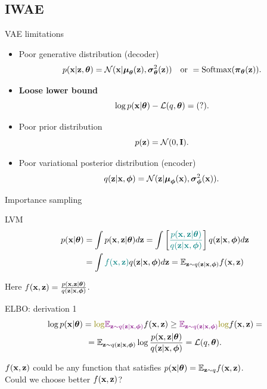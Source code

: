 \subsection{IWAE}
\begin{frame}{VAE limitations}
	\begin{itemize}
		\item Poor generative distribution (decoder)
		\[
			p(\mathbf{x} | \mathbf{z}, \boldsymbol{\theta}) = \mathcal{N}(\mathbf{x}| \boldsymbol{\mu}_{\boldsymbol{\theta}}(\mathbf{z}), \boldsymbol{\sigma}^2_{\boldsymbol{\theta}}(\mathbf{z})) \quad \text{or } = \text{Softmax}(\boldsymbol{\pi}_{\boldsymbol{\theta}}(\mathbf{z})).
		\]
		\item \textbf{Loose lower bound}
		\[
			\log p(\mathbf{x} | \boldsymbol{\theta}) - \mathcal{L}(q, \boldsymbol{\theta}) = (?).
		\]
		\item Poor prior distribution
		\[
			p(\mathbf{z}) = \mathcal{N}(0, \mathbf{I}).
		\]
		\item Poor variational posterior distribution (encoder)
		\[
			q(\mathbf{z} | \mathbf{x}, \boldsymbol{\phi}) = \mathcal{N}(\mathbf{z}| \boldsymbol{\mu}_{\boldsymbol{\phi}}(\mathbf{x}), \boldsymbol{\sigma}^2_{\boldsymbol{\phi}}(\mathbf{x})).
		\]
	\end{itemize}
\end{frame}
\begin{frame}{Importance sampling}
	\begin{block}{LVM}
		\vspace{-0.5cm}
		\begin{align*}
			p(\mathbf{x} | \boldsymbol{\theta}) &= \int p(\mathbf{x}, \mathbf{z} | \boldsymbol{\theta}) d\mathbf{z} = \int \left[{\color{teal}\frac{p(\mathbf{x}, \mathbf{z} | \boldsymbol{\theta})}{q(\mathbf{z} | \mathbf{x}, \boldsymbol{\phi})}} \right] q(\mathbf{z} | \mathbf{x}, \boldsymbol{\phi}) d\mathbf{z} \\
			&= \int {\color{teal}f(\mathbf{x}, \mathbf{z})} q(\mathbf{z} | \mathbf{x}, \boldsymbol{\phi}) d\mathbf{z} = \mathbb{E}_{\mathbf{z} \sim q(\mathbf{z} | \mathbf{x}, \boldsymbol{\phi})} f(\mathbf{x}, \mathbf{z})
		\end{align*}
	\end{block}
	Here $f(\mathbf{x}, \mathbf{z}) = \frac{p(\mathbf{x}, \mathbf{z} | \boldsymbol{\theta})}{q(\mathbf{z} | \mathbf{x}, \boldsymbol{\phi})}$.
	\begin{block}{ELBO: derivation 1}
		\vspace{-0.5cm}
		\begin{multline*}
			\log p(\bx | \btheta) = {\color{olive}\log} {\color{violet}\mathbb{E}_{\bz \sim q(\bz | \bx, \bphi)}} f(\bx, \bz)
			\geq {\color{violet}\mathbb{E}_{\bz \sim q(\bz | \bx, \bphi)}} {\color{olive}\log} f(\bx, \bz) = \\
			= \mathbb{E}_{\bz \sim q(\bz | \bx, \bphi)} \log \frac{p(\bx, \bz | \btheta)}{q(\bz | \bx, \bphi)} = \mathcal{L}(q, \btheta).
		\end{multline*}
	\end{block}
	$f(\mathbf{x}, \mathbf{z})$ could be any function that satisfies $p(\mathbf{x} | \boldsymbol{\theta})=\mathbb{E}_{\mathbf{z} \sim q} f(\mathbf{x}, \mathbf{z})$. \\
	Could we choose better $f(\mathbf{x}, \mathbf{z})$? 
\end{frame}
